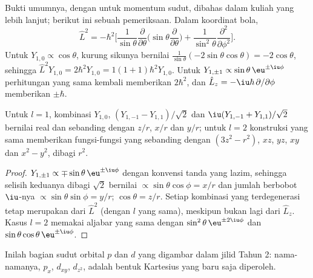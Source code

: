 Bukti umumnya, dengan  untuk momentum sudut, dibahas dalam
kuliah yang lebih lanjut; berikut ini sebuah pemeriksaan. Dalam koordinat bola,
\[
\hat L^2 = -\hbar^2\Big[\frac{1}{\sin\theta}\frac{\partial}{\partial\theta}
\Big(\sin\theta\frac{\partial}{\partial\theta}\Big) +
\frac{1}{\sin^2\theta}\frac{\partial^2}{\partial\phi^2}\Big].
\]
Untuk $Y_{1,0} \propto \cos\theta$, kurung sikunya bernilai $\frac{1}{\sin\theta}(-2\sin\theta
\cos\theta) = -2\cos\theta$, sehingga $\hat L^2Y_{1,0} = 2\hbar^2Y_{1,0} = 1(1+1)\hbar^2
Y_{1,0}$. Untuk $Y_{1,\pm1} \propto \sin\theta\,\eu^{\pm\iu\phi}$ perhitungan
yang sama kembali memberikan $2\hbar^2$, dan $\hat L_z = -\iu\hbar\,\partial/\partial
\phi$ memberikan $\pm\hbar$.

\begin{proposition}\label{prop:b3:quantum-model-systems:real-harmonics}
Untuk $l = 1$, kombinasi $Y_{1,0}$, $(Y_{1,-1} - Y_{1,1})/\sqrt2$ dan
$\iu(Y_{1,-1} + Y_{1,1})/\sqrt2$ bernilai real dan sebanding dengan $z/r$,
$x/r$ dan $y/r$; untuk $l = 2$ konstruksi yang sama memberikan fungsi-fungsi
yang sebanding dengan $(3z^2 - r^2)$, $xz$, $yz$, $xy$ dan $x^2 - y^2$, dibagi
$r^2$.
\end{proposition}

\begin{proof}
$Y_{1,\pm1} \propto \mp\sin\theta\,\eu^{\pm\iu\phi}$ dengan konvensi tanda
yang lazim, sehingga selisih keduanya dibagi $\sqrt2$ bernilai
$\propto\sin\theta\cos\phi =
x/r$ dan jumlah berbobot $\iu$-nya
$\propto\sin\theta\sin\phi = y/r$; $\cos\theta = z/r$. Setiap kombinasi
 yang terdegenerasi tetap merupakan  dari $\hat L^2$
(dengan $l$ yang sama), meskipun bukan lagi  dari $\hat
L_z$. Kasus $l = 2$ memakai aljabar yang sama dengan $\sin^2\theta\,\eu^{\pm2\iu\phi}$
dan $\sin\theta\cos\theta\,\eu^{\pm\iu\phi}$.
\end{proof}

Inilah bagian sudut orbital $p$ dan $d$ yang digambar dalam jilid Tahun 2:
nama-namanya, $p_x$, $d_{xy}$, $d_{z^2}$, adalah bentuk Kartesius yang baru
saja diperoleh.

